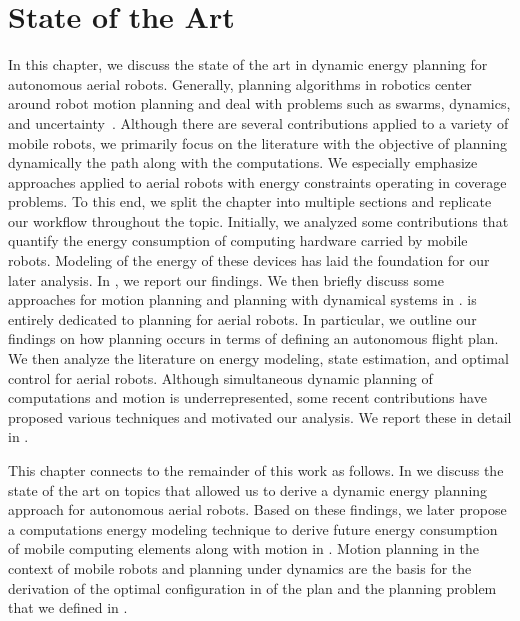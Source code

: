 
\chapter{State of the Art}
\label{cp:soa}

In this chapter, we discuss the state of the art in dynamic energy planning for autonomous aerial robots. Generally, planning algorithms in robotics center around robot motion planning and deal with problems such as swarms, dynamics, and uncertainty~\citep{lavalle2006planning}. Although there are several contributions applied to a variety of mobile robots, we primarily focus on the literature with the objective of planning dynamically the path along with the computations. We especially emphasize approaches applied to aerial robots with energy constraints operating in coverage problems. To this end, we split the chapter into multiple sections and replicate our workflow throughout the topic. Initially, we analyzed some contributions that quantify the energy consumption of computing hardware carried by mobile robots. Modeling of the energy of these devices has laid the foundation for our later analysis. In , we report our findings. We then briefly discuss some approaches for motion planning and planning with dynamical systems in .  is entirely dedicated to planning for aerial robots. In particular, we outline our findings on how planning occurs in terms of defining an autonomous flight plan. We then analyze the literature on energy modeling, state estimation, and optimal control for aerial robots. Although simultaneous dynamic planning of computations and motion is underrepresented, some recent contributions have proposed various techniques and motivated our analysis. We report these in detail in .

This chapter connects to the remainder of this work as follows. In  we discuss the state of the art on topics that allowed us to derive a dynamic energy planning approach for autonomous aerial robots. Based on these findings, we later propose a computations energy modeling technique to derive future energy consumption of mobile computing elements along with motion in . Motion planning in the context of mobile robots and planning under dynamics are the basis for the derivation of the optimal configuration in  of the plan and the planning problem that we defined in .       


